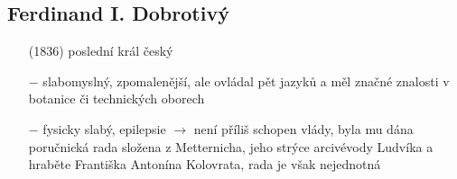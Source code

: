 \documentclass{article}
\begin{document}
\subsection*{Ferdinand I. Dobrotivý}
\begin{itemize}
    \vspace{-0.5em}
    \setlength\itemsep{0.15em}
    \item[(1836)] poslední král český
    \item[$-$] slabomyslný, zpomalenější, ale ovládal pět jazyků a měl značné znalosti v botanice či technických oborech
    \item[$-$] fysicky slabý, epilepsie $\rightarrow$ není příliš schopen vlády, byla mu dána poručnická rada složena z Metternicha, jeho strýce arcivévody Ludvíka a hraběte Františka Antonína Kolovrata, rada je však nejednotná
\end{itemize}
\end{document}
